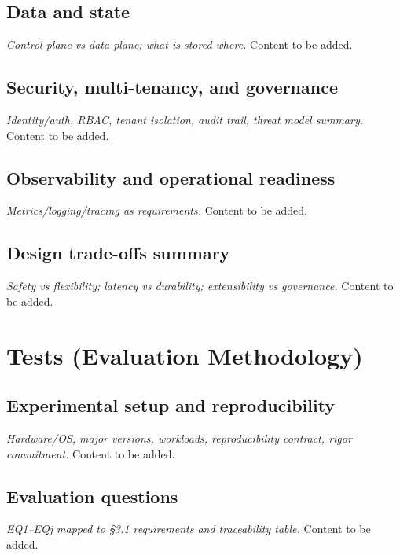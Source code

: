 \documentclass[a4paper,twoside]{sapthesis}
\begin{document}
\section{Data and state}
\label{sec:data-state}
\emph{Control plane vs data plane; what is stored where.} Content to be added.

\section{Security, multi-tenancy, and governance}
\label{sec:security}
\emph{Identity/auth, RBAC, tenant isolation, audit trail, threat model summary.} Content to be added.

\section{Observability and operational readiness}
\label{sec:observability}
\emph{Metrics/logging/tracing as requirements.} Content to be added.

\section{Design trade-offs summary}
\label{sec:design-tradeoffs}
\emph{Safety vs flexibility; latency vs durability; extensibility vs governance.} Content to be added.


\chapter{Tests (Evaluation Methodology)}
\label{ch:tests}

\section{Experimental setup and reproducibility}
\label{sec:experimental-setup}
\emph{Hardware/OS, major versions, workloads, reproducibility contract, rigor commitment.} Content to be added.

\section{Evaluation questions}
\label{sec:evaluation-questions}
\emph{EQ1–EQj mapped to §3.1 requirements and traceability table.} Content to be added.
\end{document}
